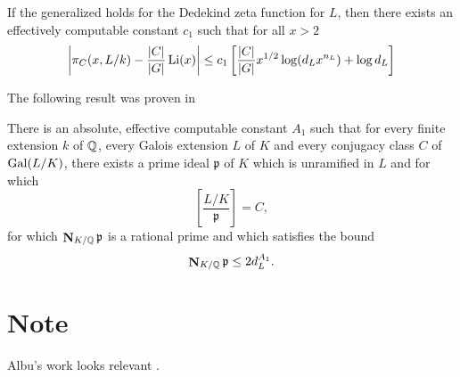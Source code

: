 \begin{proposition}
If the generalized  holds for the Dedekind
zeta function for $L$, then there exists an effectively computable
constant $c_{1}$ such that for all $x>2$
\[
\left|\pi_{C}(x, L/k) - \frac{|C|}{|G|} \mathop{\rm Li}\nolimits(x)\right|
\le c_{1} \left[ \frac{|C|}{|G|} x^{1/2} \log (d_{L} x^{n_{L}}) + \log d_{L}\right]
\]
\end{proposition}

The following result was proven in \cite{Lagarias1979-pp}

\begin{proposition} There is an
absolute, effective computable constant $A_1$ such that for every
finite extension $k$ of $\mathbb{Q}$, every Galois extension $L$ of $K$ and
every conjugacy class $C$ of $\mathop{\rm Gal}\nolimits(L/K)$, there exists a prime ideal
${\mathfrak p}$ of $K$ which is unramified in $L$ and for which 
\[
\left[ \frac{L/K}{\mathfrak p} \right ] = C,
\]
for which $\mathop{\mathbf{N}}\nolimits_{K/\mathbb{Q}} {\mathfrak p}$ is a rational prime and which
satisfies the bound
\[
\mathop{\mathbf{N}}\nolimits_{K/\mathbb{Q}} {\mathfrak p} \le 2 d_L^{A_1}.
\]
\end{proposition}

\section*{Note}

\footnotesize

 Albu's work looks relevant \cite{Albu1992-yr}.

\normalsize


